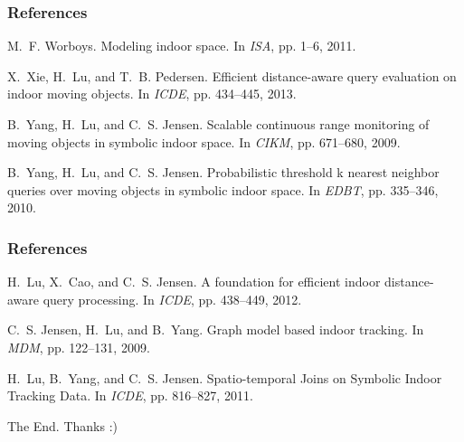 \documentclass{beamer}
\begin{document}
\begin{frame}
\frametitle{References}
\footnotesize{
\begin{thebibliography}{99} %

M.~F. Worboys.
\newblock Modeling indoor space.
\newblock In {\em {ISA}}, pp. 1--6, 2011.

X.~Xie, H.~Lu, and T.~B. Pedersen.
\newblock Efficient distance-aware query evaluation on indoor moving objects.
\newblock In {\em ICDE}, pp. 434--445, 2013.

B.~Yang, H.~Lu, and C.~S. Jensen.
\newblock Scalable continuous range monitoring of moving objects in symbolic
  indoor space.
\newblock In {\em CIKM}, pp. 671--680, 2009.

B.~Yang, H.~Lu, and C.~S. Jensen.
\newblock Probabilistic threshold k nearest neighbor queries over moving
  objects in symbolic indoor space.
\newblock In {\em EDBT}, pp. 335--346, 2010.

\end{thebibliography}
}
\end{frame}


\begin{frame}
\frametitle{References}
\footnotesize{
\begin{thebibliography}{99} %

H.~Lu, X.~Cao, and C.~S. Jensen.
\newblock A foundation for efficient indoor distance-aware query processing.
\newblock In {\em ICDE}, pp. 438--449, 2012.

C.~S. Jensen, H.~Lu, and B.~Yang.
\newblock Graph model based indoor tracking.
\newblock In {\em {MDM}}, pp. 122--131, 2009.

H.~Lu, B.~Yang, and C.~S. Jensen.
\newblock Spatio-temporal Joins on Symbolic Indoor Tracking Data.
\newblock In {\em {ICDE}}, pp. 816--827, 2011.

\end{thebibliography}
}
\end{frame}


\begin{frame}
\Huge{\centerline{The End. Thanks :)}}
\end{frame}

\end{document}
